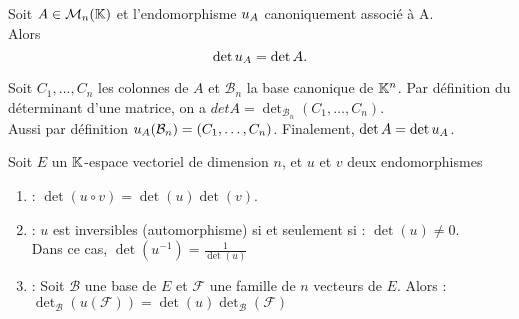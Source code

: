 \documentclass{book}
\begin{document}
\begin{Proposition}
Soit $A \in \mathcal{M}_{n}(\mathbb{K})$ et l'endomorphisme $u_{A}$ canoniquement associé à A.\\
Alors \\
 $$ \mathop{\mathrm{det}}\nolimits u_{A} = \mathop{\mathrm{det}}\nolimits A.$$
 \end{Proposition}
 \begin{Demonstration}
 Soit $C_1,\dots , C_n$ les colonnes de $A$ et $\mathcal{B}_n$ la base canonique de $\mathbb{K}^n$.
 Par définition du déterminant d'une matrice, on a $ det A =\det_{\mathcal{B}_n}(C_1,\dots,C_n)$.\\
 Aussi par définition $u_{A}(\mathcal{B}_n)=(C_1,\dots , C_n)$. Finalement,
 $ \mathop{\mathrm{det}}\nolimits A =\mathop{\mathrm{det}}\nolimits u_{A}$.
 \end{Demonstration}

\begin{Theoreme}
Soit $E$ un $\mathbb{K}$-espace vectoriel de dimension $ n$, et $ u$ et $v$ deux endomorphismes
\begin{enumerate}
\item {} : $\det(u \circ v ) = \det (u) \det(v ).$
\item {} :  $u$ est inversibles (automorphisme)  si et seulement si : $\det(u ) \neq 0.$\\
Dans ce cas, $\det(u^{-1})=\frac{1}{\det(u)}$
\item {} : Soit $\mathcal{B}$ une base de $E$ et $\mathcal{F}$ une famille de $n$ vecteurs de $E$. Alors :\\
$\det_{\mathcal{B}}(u(\mathcal{F}))=\det(u)\det_{\mathcal{B}}(\mathcal{F})$
\end{enumerate}
\end{Theoreme}
\end{document}
